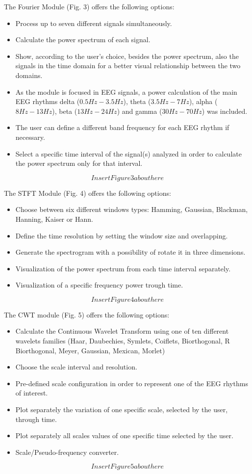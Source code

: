 \documentclass[12pt, a4paper]{article}
\begin{document}
The Fourier Module (Fig. 3) offers the following options:
\begin{itemize}
\item Process up to seven different signals simultaneously.
\item Calculate the power spectrum of each signal. 
\item Show, according to the user’s choice, besides the power spectrum, also the signals in the time domain for a better visual relationship between the two domains. 
\item As the module is focused in EEG signals, a power calculation of the main EEG rhythms delta ($0.5Hz-3.5Hz$), theta ($3.5Hz-7Hz$), alpha ($8Hz-13Hz$), beta ($13Hz-24Hz$) and gamma ($30Hz-70Hz$) was included.
\item The user can define a different band frequency for each EEG rhythm if necessary.
\item Select a specific time interval of the signal(s) analyzed in order to calculate the power spectrum only for that interval.
\end{itemize}
$$Insert Figure 3 about here$$


The STFT Module (Fig. 4) offers the following options:
\begin{itemize}
\item Choose between six different windows types: Hamming, Gaussian, Blackman, Hanning, Kaiser or Hann.
\item Define the time resolution by setting the window size and overlapping. 
\item Generate the spectrogram with a possibility of rotate it in three dimensions. 
\item Visualization of the power spectrum from each time interval separately.
\item Visualization of a specific frequency power trough time.
\end{itemize}
$$Insert Figure 4 about here$$


The CWT module (Fig. 5) offers the following options:
\begin{itemize}
\item Calculate the Continuous Wavelet Transform using one of ten different wavelets families (Haar, Daubechies, Symlets, Coiflets, Biorthogonal, R Biorthogonal, Meyer, Gaussian, Mexican, Morlet)
\item Choose the scale interval and resolution.
\item Pre-defined scale configuration in order to represent one of the EEG rhythms of interest. 
\item Plot separately the variation of one specific scale, selected by the user, through time.
\item Plot separately all scales values of one specific time selected by the user.
\item Scale/Pseudo-frequency converter.
\end{itemize}
$$Insert Figure 5 about here$$
\end{document}
